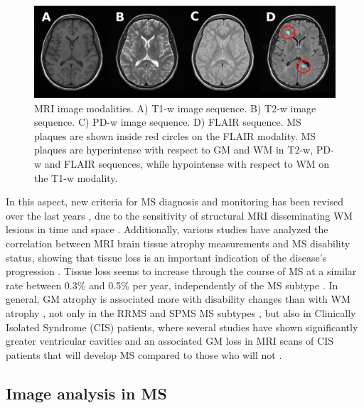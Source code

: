 \begin{figure}[top]
  \begin{center}
    \includegraphics[width=1\textwidth]{figures/figure_1.eps}
  \end{center}
    \caption[MRI image modalities]{MRI image modalities. A) T1-w image sequence. B) T2-w image sequence. C) PD-w image sequence. D) FLAIR sequence. MS plaques are shown inside red circles on the FLAIR modality. MS plaques are hyperintense with respect to GM and WM in T2-w, PD-w and FLAIR sequences, while hypointense with respect to WM on the T1-w modality.}
    \label{mri_modalities}
\end{figure}

In this aspect, new criteria for MS diagnosis and monitoring has been revised over the last years \cite{Polman2011}, due to the sensitivity of structural MRI disseminating WM lesions in time and space \cite{Filippi2011}. Additionally, various studies have analyzed the correlation between MRI brain tissue atrophy measurements and MS disability status, showing that tissue loss is an important indication of the disease's progression \cite{Chard2002, Filippi2013, Fisher2008, Rudick2009}. Tissue loss seems to increase through the course of MS at a similar rate between 0.3\% and 0.5\% per year, independently of the MS subtype \cite{DeStefano2010, Rudick2009}. In general, GM atrophy is associated more with disability changes than with WM atrophy \cite{Fisniku2008}, not only in the RRMS and SPMS MS subtypes \cite{Fisher2008, Rudick2009}, but also in Clinically Isolated Syndrome (CIS) patients, where several studies have shown significantly greater ventricular cavities and an associated GM loss in MRI scans of CIS patients that will develop MS compared to those who will not \cite{Ceccarelli2010,Filippi2013}.

\subsection{Image analysis in MS}
\label{subsec:image_analysis}

